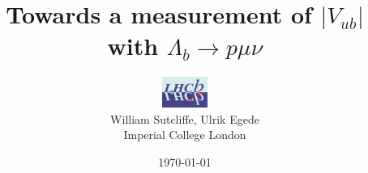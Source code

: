 \documentclass{beamer}
\begin{document}
{


\title[  $\Lambda_{b} \rightarrow p \mu \nu$ \hspace{2em}\insertframenumber/
\inserttotalframenumber]{Towards a measurement of $|V_{ub}|$  with $\Lambda_{b} \rightarrow p \mu \nu$}
\author[William Sutcliffe]{\includegraphics[height=1cm,width=1.5cm]{lhcblogo.jpg} \\ William Sutcliffe, Ulrik Egede \\ \vspace{0.5cm}Imperial College London}

\date{\today}


 \frame{\titlepage

} 







}
\end{document}

